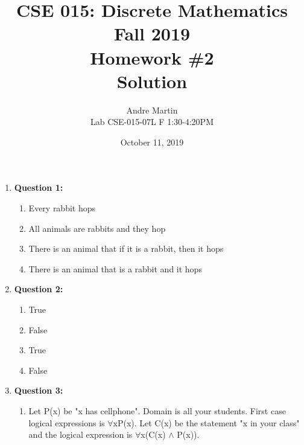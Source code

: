 \documentclass[11pt]{article}
\begin{document}
\author{Andre Martin\\
Lab CSE-015-07L F 1:30-4:20PM}

\title{CSE 015: Discrete Mathematics\\
Fall 2019\\
Homework \#2\\
Solution}

\date{October 11, 2019}
\maketitle

\begin{enumerate}

\item
\textbf{Question 1:}
\begin{enumerate}[label=(\alph*)]

\item{Every rabbit hops}

\item{All animals are rabbits and they hop}

\item{There is an animal that if it is a rabbit, then it hops}

\item{There is an animal that is a rabbit and it hops}


\end{enumerate}

\item
\textbf{Question 2:}

\begin{enumerate}[label=(\alph*)]
\item{True}
\item{False}
\item{True}
\item{False}
\end{enumerate}

\item
\textbf{Question 3:}
\begin{enumerate}[label=(\alph*)]

\item{Let P(x) be "x has cellphone". Domain is all your students. First case logical expressions is $\forall$xP(x). Let C(x) be the statement "x in your class" and the logical expression is $\forall$x(C(x) $\wedge$ P(x)).}


\end{enumerate}
\end{enumerate}
\end{document}
